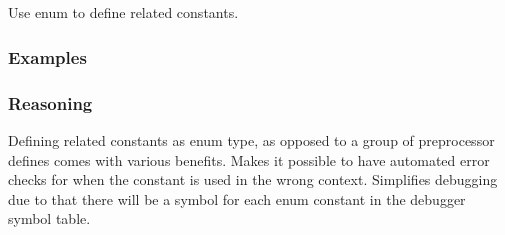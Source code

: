 \subsection*{\myRule{}}

Use enum to define related constants.

\subsubsection*{Examples}

\begin{minipage}[t]{0.47\linewidth}
    
\end{minipage}
\hfill
\begin{minipage}[t]{0.47\linewidth}
    
\end{minipage}

\subsubsection*{Reasoning}

Defining related constants as enum type, as opposed to a group of preprocessor defines comes with various benefits. Makes it possible to have automated error checks for when the constant is used in the wrong context. Simplifies debugging due to that there will be a symbol for each enum constant in the debugger symbol table.
